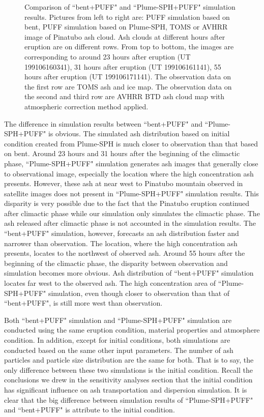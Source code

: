 \begin{figure}[!htb]
\begin{minipage}{.325 \textwidth}
    \end{minipage}%
    \caption{Comparison of ``bent+PUFF" and ``Plume-SPH+PUFF" simulation results. Pictures from left to right are: PUFF simulation based on bent, PUFF simulation based on Plume-SPH, TOMS or AVHRR image of Pinatubo ash cloud. Ash clouds at different hours after eruption are on different rows. From top to bottom, the images are corresponding to around 23 hours after eruption (UT 199106160341), 31 hours after eruption (UT 199106161141), 55 hours after eruption (UT 199106171141). The observation data on the first row are TOMS ash and ice map. The observation data on the second and third row are AVHRR BTD ash cloud map with atmospheric correction method applied.}
    \label{fig:Plume-SPH-PUFF-ash-cloud}
\end{figure}

The difference in simulation results between ``bent+PUFF" and ``Plume-SPH+PUFF" is obvious. The simulated ash distribution based on initial condition created from Plume-SPH is much closer to observation than that based on bent. Around 23 hours and 31 hours after the beginning of the climactic phase, ``Plume-SPH+PUFF" simulation generates ash images that generally close to observational image, especially the location where the high concentration ash presents. However, these ash at near west to Pinatubo mountain observed in satellite images does not present in ``Plume-SPH+PUFF" simulation results. This disparity is very possible due to the fact that the Pinatubo eruption continued after climactic phase while our simulation only simulates the climactic phase. The ash released after climactic phase is not accounted in the simulation results. The ``bent+PUFF" simulation, however, forecasts an ash distribution faster and narrower than observation. The location, where the high concentration ash presents, locates to the northwest of observed ash. 
Around 55 hours after the beginning of the climactic phase, the disparity between observation and simulation becomes more obvious. Ash distribution of ``bent+PUFF" simulation locates far west to the observed ash. The high concentration area of ``Plume-SPH+PUFF" simulation, even though closer to observation than that of ``bent+PUFF", is still more west than observation.

Both ``bent+PUFF" simulation and ``Plume-SPH+PUFF" simulation are conducted using the same eruption condition, material properties and atmosphere condition. In addition, except for initial conditions, both simulations are conducted based on the same other input parameters. The number of ash particles and particle size distribution are the same for both. That is to say, the only difference between these two simulations is the initial condition. Recall the conclusions we drew in the sensitivity analyses section that the initial condition has significant influence on ash transportation and dispersion simulation. It is clear that the big difference between simulation results of ``Plume-SPH+PUFF" and ``bent+PUFF" is attribute to the initial condition.

